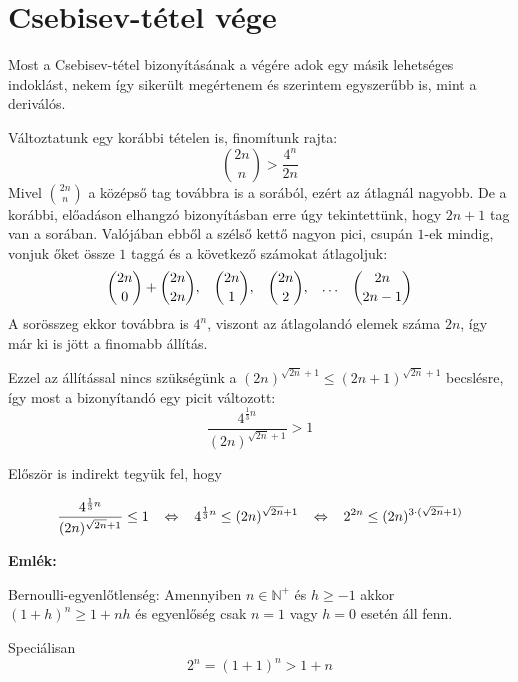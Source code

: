 \documentclass[12pt]{book}
\theoremstyle{plain} %
\theoremstyle{definition} %
\theoremstyle{remark}
\numberwithin{equation}{section}  %
\def\N{\mathbb{N}}
\begin{document}
	\section{Csebisev-tétel vége}
	
	Most a Csebisev-tétel bizonyításának a végére adok egy másik lehetséges indoklást, nekem így sikerült megértenem és szerintem egyszerűbb is, mint a deriválós. 
	
	Változtatunk egy korábbi tételen is, finomítunk rajta: 
	\[ {2n\choose n } > \dfrac{4^n}{2n}  \]
	Mivel ${2n\choose n}$ a középső tag továbbra is a sorából, ezért az átlagnál nagyobb. De a korábbi, előadáson elhangzó bizonyításban erre úgy tekintettünk, hogy $2n+1$ tag van a sorában.	 Valójában ebből a szélső kettő nagyon pici, csupán $1$-ek mindig, vonjuk őket össze $1$ taggá és a következő számokat átlagoljuk:
	\[ {2n\choose 0} + {2n\choose 2n},\hspace{3mm} {2n\choose 1},\hspace{3mm} {2n\choose 2}, \hspace{3mm} \ldots \hspace{3mm} {2n\choose 2n-1}  \]
	A sorösszeg ekkor továbbra is $4^n$, viszont az átlagolandó elemek száma $2n$, így már ki is jött a finomabb állítás. %
	
	Ezzel az állítással nincs szükségünk a $(2n)^{\sqrt{2n}+1} \leq (2n+1)^{\sqrt{2n}+1}$ becslésre, így most a bizonyítandó egy picit változott:
	\[ \dfrac{4^{\frac{1}{3}n}}{(2n)^{\sqrt{2n}+1}} > 1 \]
	
	Először is indirekt tegyük fel, hogy 
	
	\begin{equation}\label{equi}
		\dfrac{4^{\frac{1}{3}n}}{(2n)^{\sqrt{2n}+1}} \leq 1 \hspace{3mm} \Leftrightarrow \hspace{3mm} 4^{\frac{1}{3}n} \leq (2n)^{\sqrt{2n}+1} \hspace{3mm} \Leftrightarrow \hspace{3mm} 2^{2n} \leq (2n)^{3\cdot (\sqrt{2n} + 1)} 
	\end{equation}
	
	\textbf{Emlék:}
	
	Bernoulli-egyenlőtlenség: Amennyiben $n\in \N^+$ és $h\geq -1$ akkor $(1+h)^n \geq 1+nh$ és egyenlőség csak $n=1$ vagy $h=0$ esetén áll fenn.
	
	Speciálisan
	\begin{equation}\label{bern}
		2^n = (1+1)^n > 1+n
	\end{equation}
	
\end{document}
